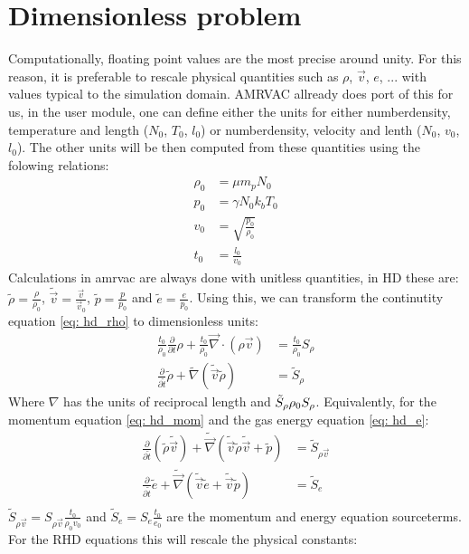 \section{Dimensionless problem}
Computationally, floating point values are the most precise around unity. For this reason, it is preferable to rescale physical quantities such as $\rho$, $\vec{v}$, $e$, ... with values typical to the simulation domain. AMRVAC allready does port of this for us, in the user module, one can define either the units for either numberdensity, temperature  and length ($N_0$, $T_0$, $l_0$) or  numberdensity, velocity  and lenth ($N_0$, $v_0$, $l_0$). The other units will be then computed from these quantities using the folowing relations:
\begin{align}
\rho_0 &= \mu m_p N_0 \\
   p_0 &= \gamma N_0 k_b T_0 \\
   v_0 &= \sqrt{\frac{p_0}{\rho_0}} \\
   t_0 &= \frac{l_0}{v_0}
\end{align}
Calculations in amrvac are always done with unitless quantities, in HD these are: $\tilde{\rho} = \frac{\rho}{\rho_0}$, $\tilde{\vec{v}} = \frac{\vec{v}}{\vec{v}_0}$, $\tilde{p} = \frac{p}{p_0}$ and $\tilde{e} = \frac{e}{p_0}$. Using this, we can transform the continutity equation \eqref{eq: hd_rho} to dimensionless units:
\begin{align}
\frac{t_0}{\rho_0} \frac{\partial}{\partial t} \rho  + \frac{t_0}{\rho_0} \vec{\nabla} \cdot \left( \rho \vec{v}  \right) &= \frac{t_0}{\rho_0} S_\rho \\
\frac{\partial}{\partial \tilde{t}} \tilde{\rho} + \tilde{\nabla} \left( \tilde{\vec{v}} \tilde{\rho} \right) &= \tilde{S}_\rho
\end{align}
Where $\nabla$ has the units of reciprocal length and $\tilde{S}_\rho \def \frac{t_0}{\rho_0} S_\rho$. Equivalently, for the momentum equation \eqref{eq: hd_mom} and the gas energy equation \eqref{eq: hd_e}:
\begin{align}
\frac{\partial}{\partial \tilde{t}} \left(\tilde{\rho} \tilde{\vec{v}} \right) + \tilde{\vec{\nabla}} \left(\tilde{\vec{v}} \tilde{\rho}  \tilde{\vec{v}} + \tilde{p} \right) &= \tilde{S}_{\rho \vec{v}} \\
\frac{\partial}{\partial \tilde{t}} \tilde{e} + \tilde{\vec{\nabla}} \left(\tilde{\vec{v}} \tilde{e} + \tilde{\vec{v}} \tilde{p} \right) &= \tilde{S}_e \\
\end{align}
$\tilde{S}_{\rho \vec{v}} = S_{\rho \vec{v}} \frac{t_0}{\rho_0 v_0}$ and $\tilde{S}_e = S_e \frac{t_0}{e_0}$ are the momentum and energy equation sourceterms. For the RHD equations this will rescale the physical constants:
